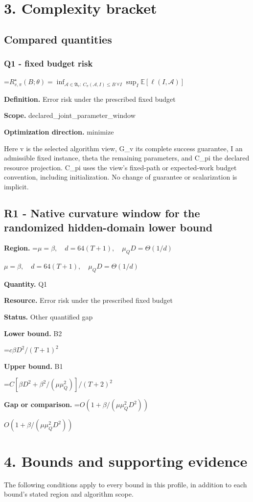 \documentclass[10pt,a4paper]{article}
\newcommand{\AtlasMath}[1]{\par\begingroup\centering\setbox0=\hbox{$\displaystyle #1$}\ifdim\wd0>1.4\linewidth\typeout{ATLAS WIDE FORMULA: \the\wd0}\fi\ifdim\wd0>\linewidth\resizebox{\linewidth}{!}{\box0}\else\box0\fi\par\endgroup}
\newcommand{\AtlasInlineMath}[1]{\begingroup\setbox0=\hbox{$#1$}\ifdim\wd0>.4\linewidth\endgroup\AtlasMath{#1}\else\endgroup$#1$\fi}
\begin{document}
\section{3. Complexity bracket}
\subsection{Compared quantities}
\subsubsection{Q1 - fixed budget risk}
\AtlasMath{R^\star_{v,\pi}(B;\theta)=\inf_{\mathcal A\in\mathfrak A_v:\ C_\pi(\mathcal A,I)\le B\ \forall I}\sup_I\mathbb E[\ell(I,\mathcal A)]}
\textbf{Definition.} Error risk under the prescribed fixed budget

\textbf{Scope.} declared\_joint\_parameter\_window

\textbf{Optimization direction.} minimize

Here v is the selected algorithm view, G\_v its complete success guarantee, I an admissible fixed instance, theta the remaining parameters, and C\_pi the declared resource projection. C\_pi uses the view's fixed-path or expected-work budget convention, including initialization. No change of guarantee or scalarization is implicit.

\subsection{R1 - Native curvature window for the randomized hidden-domain lower bound}
\textbf{Region.} \AtlasInlineMath{\mu=\beta,\quad d=64(T+1),\quad\mu_QD=\Theta(1/d)}

\textbf{Quantity.} Q1

\textbf{Resource.} Error risk under the prescribed fixed budget

\textbf{Status.} Other quantified gap

\textbf{Lower bound.} B2

\AtlasMath{c\beta D^2/(T+1)^2}
\textbf{Upper bound.} B1

\AtlasMath{C[\beta D^2+\beta^2/(\mu\mu_Q^2)]/(T+2)^2}
\textbf{Gap or comparison.} \AtlasInlineMath{O(1+\beta/(\mu\mu_Q^2D^2))}

\section{4. Bounds and supporting evidence}
The following conditions apply to every bound in this profile, in addition to each bound's stated region and algorithm scope.
\end{document}
